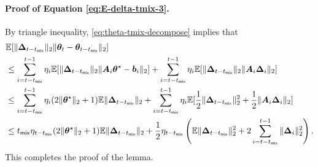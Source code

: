\paragraph{Proof of Equation \eqref{eq:E-delta-tmix-3}.} By triangle inequality, \eqref{eq:theta-tmix-decompose} implies that
\begin{align*}
&\mathbb{E}[\|\bm{\Delta}_{t-t_{\mathsf{mix}}}\|_2 \|\bm{\theta}_{t} - \bm{\theta}_{t-t_{\mathsf{mix}}}\|_2] \\ 
&\leq \sum_{i=t-t_{\mathsf{mix}}}^{t-1} \eta_i \mathbb{E}[\|\bm{\Delta}_{t-t_{\mathsf{mix}}}\|_2 \|\bm{A}_i\bm{\theta}^\star-\bm{b}_i\|_2] + \sum_{i=t-t_{\mathsf{mix}}}^{t-1} \eta_i \mathbb{E}[\|\bm{\Delta}_{t-t_{\mathsf{mix}}}\|_2 \|\bm{A}_i\bm{\Delta}_i\|_2] \\ 
&\leq \sum_{i=t-t_{\mathsf{mix}}}^{t-1} \eta_i (2\|\bm{\theta}^\star\|_2+1)\mathbb{E}\|\bm{\Delta}_{t-t_{\mathsf{mix}}}\|_2 + \sum_{i=t-t_{\mathsf{mix}}}^{t-1} \eta_i \mathbb{E}[\frac{1}{2}\|\bm{\Delta}_{t-t_{\mathsf{mix}}}\|_2^2 + \frac{1}{2}\|\bm{A}_i\bm{\Delta}_i\|_2] \\ 
&\leq t_{\mathsf{mix}} \eta_{t-t_{\mathsf{mix}}}(2\|\bm{\theta}^\star\|_2+1)\mathbb{E}\|\bm{\Delta}_{t-t_{\mathsf{mix}}}\|_2 + \frac{1}{2}\eta_{t-t_{\mathsf{mix}}} \left(\mathbb{E}\|\bm{\Delta}_{t-t_{\mathsf{mix}}}\|_2^2 + 2\sum_{i=t-t_{\mathsf{mix}}}^{t-1} \|\bm{\Delta}_i\|_2^2\right).
\end{align*}
This completes the proof of the lemma. 

